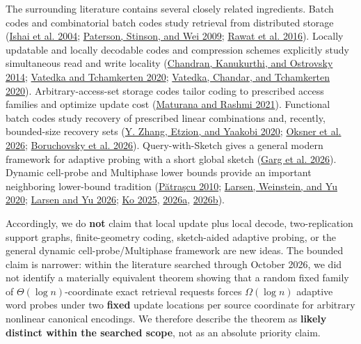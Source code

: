 \documentclass[
]{article}
\begin{document}
The surrounding literature contains several closely related ingredients.
Batch codes and combinatorial batch codes study retrieval from
distributed storage (\protect\hyperlink{ref-ishai2004batch}{Ishai et al.
2004}; \protect\hyperlink{ref-paterson2009cbc}{Paterson, Stinson, and
Wei 2009}; \protect\hyperlink{ref-rawat2016batchgraphs}{Rawat et al.
2016}). Locally updatable and locally decodable codes and compression
schemes explicitly study simultaneous read and write locality
(\protect\hyperlink{ref-chandran2014luldc}{Chandran, Kanukurthi, and
Ostrovsky 2014}; \protect\hyperlink{ref-vatedka2020bigdata}{Vatedka and
Tchamkerten 2020}; \protect\hyperlink{ref-vatedka2020worstcase}{Vatedka,
Chandar, and Tchamkerten 2020}). Arbitrary-access-set storage codes
tailor coding to prescribed access families and optimize update cost
(\protect\hyperlink{ref-maturana2021arbitrary}{Maturana and Rashmi
2021}). Functional batch codes study recovery of prescribed linear
combinations and, recently, bounded-size recovery sets
(\protect\hyperlink{ref-zhang2020functional}{Y. Zhang, Etzion, and
Yaakobi 2020}; \protect\hyperlink{ref-oksner2026functional}{Oksner et
al. 2026}; \protect\hyperlink{ref-boruchovsky2026allsymbol}{Boruchovsky
et al. 2026}). Query-with-Sketch gives a general modern framework for
adaptive probing with a short global sketch
(\protect\hyperlink{ref-garg2026qws}{Garg et al. 2026}). Dynamic
cell-probe and Multiphase lower bounds provide an important neighboring
lower-bound tradition
(\protect\hyperlink{ref-patrascu2010multiphase}{Pătraşcu 2010};
\protect\hyperlink{ref-larsen2020boolean}{Larsen, Weinstein, and Yu
2020}; \protect\hyperlink{ref-larsen2026dynamicgraphs}{Larsen and Yu
2026}; \protect\hyperlink{ref-ko2025landscape}{Ko 2025},
\protect\hyperlink{ref-ko2026boolean}{2026a},
\protect\hyperlink{ref-ko2026dynamicgraphs}{2026b}).

Accordingly, we do \textbf{not} claim that local update plus local
decode, two-replication support graphs, finite-geometry coding,
sketch-aided adaptive probing, or the general dynamic
cell-probe/Multiphase framework are new ideas. The bounded claim is
narrower: within the literature searched through October 2026, we did
not identify a materially equivalent theorem showing that a random fixed
family of \(\Theta(\log n)\)-coordinate exact retrieval requests forces
\(\Omega(\log n)\) adaptive word probes under two \textbf{fixed} update
locations per source coordinate for arbitrary nonlinear canonical
encodings. We therefore describe the theorem as \textbf{likely distinct
within the searched scope}, not as an absolute priority claim.
\end{document}

